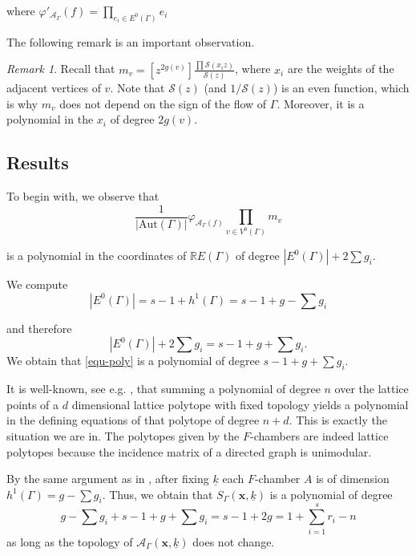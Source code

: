 \documentclass[10pt,a4paper,oneside,no-math,reqno]{amsart}%
\theoremstyle{plain}
\theoremstyle{definition}
\theoremstyle{remark}
\newtheorem{remark}[theorem]{Remark}
\numberwithin{equation}{section}
\renewcommand{\phi}{\varphi}
\newcommand{\mc}[1]{\mathcal{#1}}
\newcommand{\1}{\mathds{1}}
\newcommand{\<}{\langle}
\renewcommand{\>}{\rangle}
\begin{document}
where $\phi'_{\mathcal{A}_\Gamma}(f)=\prod_{e_i\in E^0(\Gamma)} e_i$

The following remark is an important observation.

\begin{remark}
Recall that $m_v=[z^{2g(v)}]\frac{\prod\mathcal{S}(x_iz)}{\mc{S}(z)}$, where $x_i$ are the weights of the adjacent vertices of $v$. Note that $\mathcal{S}(z)$ (and $1/\mathcal{S}(z)$) is an even function, which is why $m_v$ does not depend on the sign of the flow of $\Gamma$. Moreover, it is a polynomial in the $x_i$ of degree $2g(v)$.
\end{remark}

\subsection{Results}

To begin with, we observe that
\begin{equation}
\label{equ-poly}
    \frac{1}{|\mathrm{Aut}(\Gamma)|}\phi_{\mathcal{A}_\Gamma(f)}\prod_{v\in V^0(\Gamma)}m_v
\end{equation}

 is a polynomial in the coordinates of $\mathbb{R}E(\Gamma)$ of degree $|E^0(\Gamma)|+2\sum g_i$.

 We compute
 \begin{equation}
     |E^0(\Gamma)|=s-1+h^1(\Gamma)=s-1+g-\sum g_i
 \end{equation}

 and therefore 
 \begin{equation}
     |E^0(\Gamma)|+2\sum g_i=s-1+g+\sum g_i.
 \end{equation}
 We obtain that \cref{equ-poly} is a polynomial of degree $s-1+g+\sum g_i$.

 It is well-known, see e.g. \cite[Theorem 4.6]{AB17}, that summing a polynomial of degree $n$ over the lattice points of a $d$ dimensional lattice polytope with fixed topology yields a polynomial in the defining equations of that polytope of degree $n+d$. This is exactly the situation we are in. The polytopes given by the $F$-chambers are indeed lattice polytopes because the incidence matrix of a directed graph is unimodular.

 By the same argument as in \cite[Remark 2.11]{CJM11}, after fixing $\underline{k}$ each $F$-chamber $A$ is of dimension $h^1(\Gamma)=g-\sum g_i$.
 Thus, we obtain that $S_\Gamma(\textbf{x},\underline{k})$ is a polynomial of degree
 \begin{equation}
     g-\sum g_i+s-1+g+\sum g_i
     =
     s-1+2g
     =
     1+\sum_{i=1}^s r_i -n
 \end{equation}
 as long as the topology of $\mathcal{A}_\Gamma(\textbf{x},\underline{k})$ does not change. 
 
\end{document}
